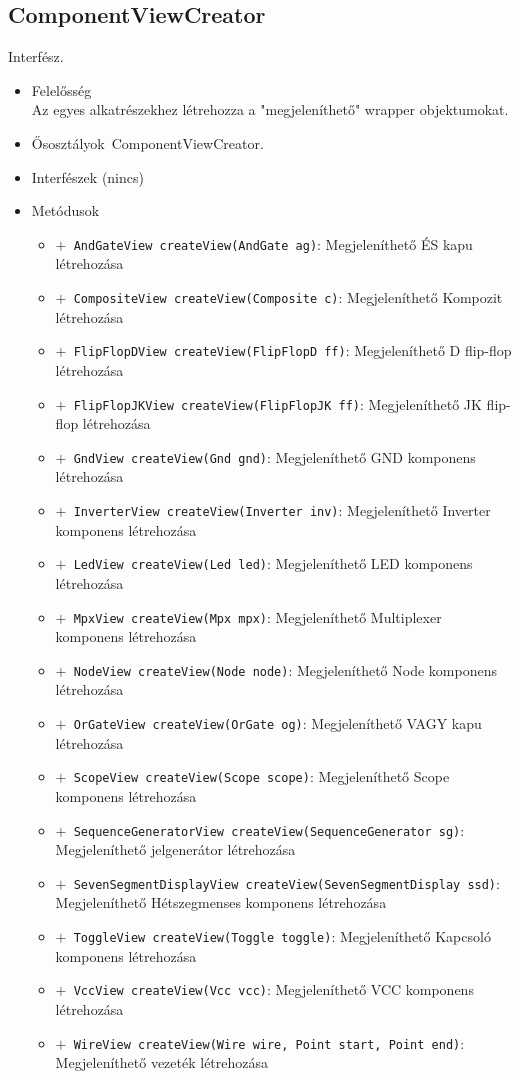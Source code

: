 \subsection{ComponentViewCreator}
Interfész.
\begin{itemize}
\item Felelősség\\
Az egyes alkatrészekhez létrehozza a "megjeleníthető" wrapper objektumokat.
\item Ősosztályok\ ComponentViewCreator.
\item Interfészek (nincs)
\item Metódusok$\ $
\begin{itemize}
	\item[] \texttt{$+$ AndGateView createView(AndGate ag)}: Megjeleníthető ÉS kapu létrehozása
	\item[] \texttt{$+$ CompositeView createView(Composite c)}: Megjeleníthető Kompozit létrehozása
	\item[] \texttt{$+$ FlipFlopDView createView(FlipFlopD ff)}: Megjeleníthető D flip-flop létrehozása
	\item[] \texttt{$+$ FlipFlopJKView createView(FlipFlopJK ff)}: Megjeleníthető JK flip-flop létrehozása
	\item[] \texttt{$+$ GndView createView(Gnd gnd)}: Megjeleníthető GND komponens létrehozása
	\item[] \texttt{$+$ InverterView createView(Inverter inv)}: Megjeleníthető Inverter komponens létrehozása
	\item[] \texttt{$+$ LedView createView(Led led)}: Megjeleníthető LED komponens létrehozása
	\item[] \texttt{$+$ MpxView createView(Mpx mpx)}: Megjeleníthető Multiplexer komponens létrehozása
	\item[] \texttt{$+$ NodeView createView(Node node)}: Megjeleníthető Node komponens létrehozása
	\item[] \texttt{$+$ OrGateView createView(OrGate og)}: Megjeleníthető VAGY kapu létrehozása
	\item[] \texttt{$+$ ScopeView createView(Scope scope)}: Megjeleníthető Scope komponens létrehozása
	\item[] \texttt{$+$ SequenceGeneratorView createView(SequenceGenerator sg)}: Megjeleníthető jelgenerátor létrehozása
	\item[] \texttt{$+$ SevenSegmentDisplayView createView(SevenSegmentDisplay ssd)}: Megjeleníthető Hétszegmenses komponens létrehozása
	\item[] \texttt{$+$ ToggleView createView(Toggle toggle)}: Megjeleníthető Kapcsoló komponens létrehozása
	\item[] \texttt{$+$ VccView createView(Vcc vcc)}: Megjeleníthető VCC komponens létrehozása
	\item[] \texttt{$+$ WireView createView(Wire wire, Point start, Point end)}: Megjeleníthető vezeték létrehozása
\end{itemize}
\end{itemize}

